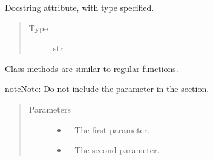 \documentclass[letterpaper,10pt,english]{sphinxmanual}
\begin{document}
\begin{description}
\begin{fulllineitems}
\begin{fulllineitems}
\begin{quote}
\begin{description}
\end{description}\end{quote}

\end{fulllineitems}


\begin{fulllineitems}
\label{\detokenize{autogen:example_docstring.ExampleClass.attr5}}
Docstring  attribute, with type specified.
\begin{quote}\begin{description}
\item[{Type}] \leavevmode
str

\end{description}\end{quote}

\end{fulllineitems}


\begin{fulllineitems}
\label{\detokenize{autogen:example_docstring.ExampleClass.example_method}}
Class methods are similar to regular functions.

\begin{sphinxadmonition}{note}{Note:}
Do not include the  parameter in the  section.
\end{sphinxadmonition}
\begin{quote}\begin{description}
\item[{Parameters}] \leavevmode\begin{itemize}
\item {} 
 – The first parameter.

\item {} 
 – The second parameter.

\end{itemize}


\end{description}
\end{quote}
\end{fulllineitems}
\end{fulllineitems}
\end{description}
\end{document}
